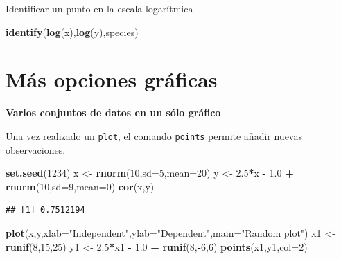 \documentclass[]{book}
\newenvironment{Shaded}{\begin{snugshade}}{\end{snugshade}}
\newcommand{\KeywordTok}[1]{\textcolor[rgb]{0.13,0.29,0.53}{\textbf{#1}}}
\newcommand{\DataTypeTok}[1]{\textcolor[rgb]{0.13,0.29,0.53}{#1}}
\newcommand{\DecValTok}[1]{\textcolor[rgb]{0.00,0.00,0.81}{#1}}
\newcommand{\FloatTok}[1]{\textcolor[rgb]{0.00,0.00,0.81}{#1}}
\newcommand{\StringTok}[1]{\textcolor[rgb]{0.31,0.60,0.02}{#1}}
\newcommand{\OperatorTok}[1]{\textcolor[rgb]{0.81,0.36,0.00}{\textbf{#1}}}
\newcommand{\NormalTok}[1]{#1}
\begin{document}
Identificar un punto en la escala logarítmica

\begin{Shaded}
\begin{Highlighting}[]
\KeywordTok{identify}\NormalTok{(}\KeywordTok{log}\NormalTok{(x),}\KeywordTok{log}\NormalTok{(y),species)}
\end{Highlighting}
\end{Shaded}

\section{Más opciones gráficas}\label{mas-opciones-graficas}

\textbf{Varios conjuntos de datos en un sólo gráfico}

Una vez realizado un \texttt{plot}, el comando \texttt{points} permite
añadir nuevas observaciones.

\begin{Shaded}
\begin{Highlighting}[]
\KeywordTok{set.seed}\NormalTok{(}\DecValTok{1234}\NormalTok{)}
\NormalTok{ x <-}\StringTok{ }\KeywordTok{rnorm}\NormalTok{(}\DecValTok{10}\NormalTok{,}\DataTypeTok{sd=}\DecValTok{5}\NormalTok{,}\DataTypeTok{mean=}\DecValTok{20}\NormalTok{)}
\NormalTok{ y <-}\StringTok{ }\FloatTok{2.5}\OperatorTok{*}\NormalTok{x }\OperatorTok{-}\StringTok{ }\FloatTok{1.0} \OperatorTok{+}\StringTok{ }\KeywordTok{rnorm}\NormalTok{(}\DecValTok{10}\NormalTok{,}\DataTypeTok{sd=}\DecValTok{9}\NormalTok{,}\DataTypeTok{mean=}\DecValTok{0}\NormalTok{)}
 \KeywordTok{cor}\NormalTok{(x,y)}
\end{Highlighting}
\end{Shaded}

\begin{verbatim}
## [1] 0.7512194
\end{verbatim}

\begin{Shaded}
\begin{Highlighting}[]
 \KeywordTok{plot}\NormalTok{(x,y,}\DataTypeTok{xlab=}\StringTok{"Independent"}\NormalTok{,}\DataTypeTok{ylab=}\StringTok{"Dependent"}\NormalTok{,}\DataTypeTok{main=}\StringTok{"Random plot"}\NormalTok{)}
\NormalTok{ x1 <-}\StringTok{ }\KeywordTok{runif}\NormalTok{(}\DecValTok{8}\NormalTok{,}\DecValTok{15}\NormalTok{,}\DecValTok{25}\NormalTok{)}
\NormalTok{ y1 <-}\StringTok{ }\FloatTok{2.5}\OperatorTok{*}\NormalTok{x1 }\OperatorTok{-}\StringTok{ }\FloatTok{1.0} \OperatorTok{+}\StringTok{ }\KeywordTok{runif}\NormalTok{(}\DecValTok{8}\NormalTok{,}\OperatorTok{-}\DecValTok{6}\NormalTok{,}\DecValTok{6}\NormalTok{)}
 \KeywordTok{points}\NormalTok{(x1,y1,}\DataTypeTok{col=}\DecValTok{2}\NormalTok{)}
\end{Highlighting}
\end{Shaded}
\end{document}
